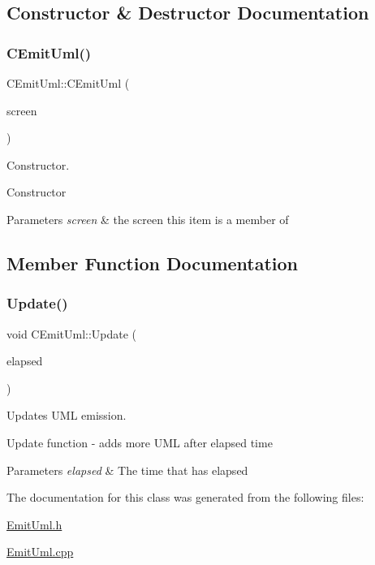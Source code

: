 \subsection{Constructor \& Destructor Documentation}
\mbox{\label{class_c_emit_uml_ae09b06fae88495e3d0405b2b59ca215b}} 
\subsubsection{\texorpdfstring{CEmitUml()}{CEmitUml()}}
{\footnotesize\ttfamily C\+Emit\+Uml\+::\+C\+Emit\+Uml (\begin{DoxyParamCaption}\item[{\mbox{\hyperlink{class_c_screen}{C\+Screen}} $\ast$}]{screen }\end{DoxyParamCaption})}



Constructor. 

Constructor 
\begin{DoxyParams}{Parameters}
{\em screen} & the screen this item is a member of \\
\hline
\end{DoxyParams}


\subsection{Member Function Documentation}
\mbox{\label{class_c_emit_uml_a62f420af81daac9a4c2a54d5692c84a7}} 
\subsubsection{\texorpdfstring{Update()}{Update()}}
{\footnotesize\ttfamily void C\+Emit\+Uml\+::\+Update (\begin{DoxyParamCaption}\item[{double}]{elapsed }\end{DoxyParamCaption})}



Updates U\+ML emission. 

Update function -\/ adds more U\+ML after elapsed time 
\begin{DoxyParams}{Parameters}
{\em elapsed} & The time that has elapsed \\
\hline
\end{DoxyParams}


The documentation for this class was generated from the following files\+:\begin{DoxyCompactItemize}
\item 
\mbox{\hyperlink{_emit_uml_8h}{Emit\+Uml.\+h}}\item 
\mbox{\hyperlink{_emit_uml_8cpp}{Emit\+Uml.\+cpp}}\end{DoxyCompactItemize}
